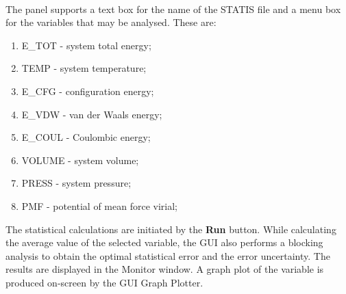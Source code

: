 ~

The panel supports a text box for the name of the STATIS file and a
menu box for the variables that may be analysed. These are:
\begin{enumerate}
\item E\_TOT - system total energy;
\item TEMP - system temperature;
\item E\_CFG - configuration energy;
\item E\_VDW - van der Waals energy;
\item E\_COUL - Coulombic energy;
\item VOLUME - system volume;
\item PRESS - system pressure;
\item PMF - potential of mean force virial;
\end{enumerate}
The statistical calculations are initiated by the {\bf Run} button.
While calculating the average value of the selected variable, the GUI
also performs a blocking analysis to obtain the optimal statistical
error and the error uncertainty. The results are displayed in the
Monitor window. A graph plot of the variable is produced on-screen
by the GUI Graph Plotter.

